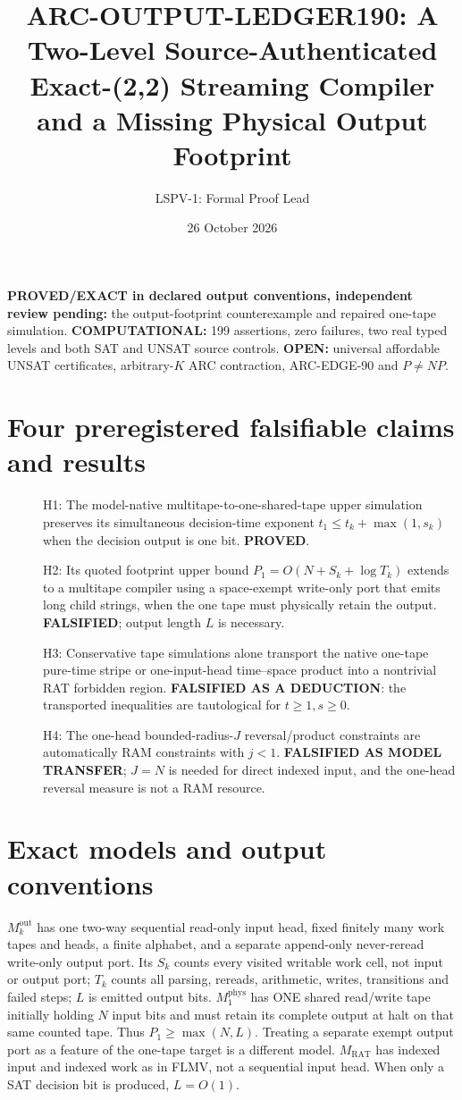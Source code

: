 \documentclass[11pt]{article}
\title{ARC-OUTPUT-LEDGER190: A Two-Level Source-Authenticated Exact-(2,2) Streaming Compiler and a Missing Physical Output Footprint}
\author{LSPV-1: Formal Proof Lead}
\date{26 October 2026}
\begin{document}
\maketitle
\noindent\textbf{PROVED/EXACT in declared output conventions, independent review pending:} the output-footprint counterexample and repaired one-tape simulation. \textbf{COMPUTATIONAL:} 199 assertions, zero failures, two real typed levels and both SAT and UNSAT source controls. \textbf{OPEN:} universal affordable UNSAT certificates, arbitrary-$K$ ARC contraction, ARC-EDGE-90 and $P\ne NP$.

\section{Four preregistered falsifiable claims and results}
\begin{description}
\item[] H1: The model-native multitape-to-one-shared-tape upper simulation preserves its simultaneous decision-time exponent $t_1\le t_k+\max(1,s_k)$ when the decision output is one bit. \textbf{PROVED}.
\item[] H2: Its quoted footprint upper bound $P_1=O(N+S_k+\log T_k)$ extends to a multitape compiler using a space-exempt write-only port that emits long child strings, when the one tape must physically retain the output. \textbf{FALSIFIED}; output length $L$ is necessary.
\item[] H3: Conservative tape simulations alone transport the native one-tape pure-time stripe or one-input-head time--space product into a nontrivial RAT forbidden region. \textbf{FALSIFIED AS A DEDUCTION}: the transported inequalities are tautological for $t\ge1,s\ge0$.
\item[] H4: The one-head bounded-radius-$J$ reversal/product constraints are automatically RAM constraints with $j<1$. \textbf{FALSIFIED AS MODEL TRANSFER}; $J=N$ is needed for direct indexed input, and the one-head reversal measure is not a RAM resource.
\end{description}

\section{Exact models and output conventions}
$M_k^{\mathrm{out}}$ has one two-way sequential read-only input head, fixed finitely many work tapes and heads, a finite alphabet, and a separate append-only never-reread write-only output port. Its $S_k$ counts every visited writable work cell, not input or output port; $T_k$ counts all parsing, rereads, arithmetic, writes, transitions and failed steps; $L$ is emitted output bits. $M_1^{\mathrm{phys}}$ has ONE shared read/write tape initially holding $N$ input bits and must retain its complete output at halt on that same counted tape. Thus $P_1\ge\max(N,L)$. Treating a separate exempt output port as a feature of the one-tape target is a different model. $M_{\mathrm{RAT}}$ has indexed input and indexed work as in FLMV, not a sequential input head. When only a SAT decision bit is produced, $L=O(1)$.
\end{document}
